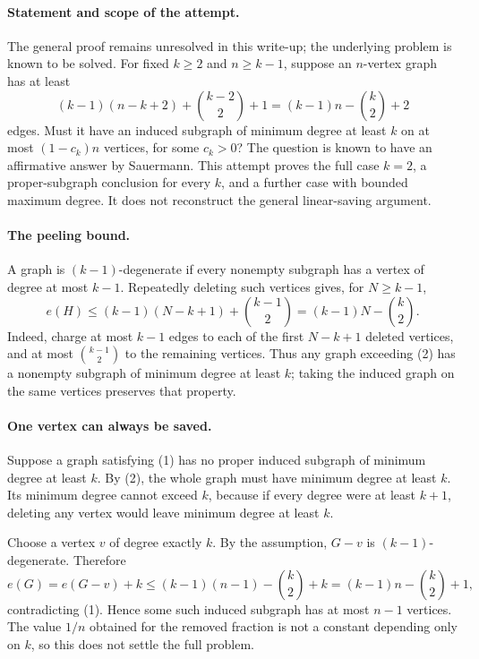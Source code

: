 \paragraph{Statement and scope of the attempt.}
The general proof remains unresolved in this write-up; the underlying problem is known to be solved.
For fixed \(k\geq2\) and \(n\geq k-1\), suppose an \(n\)-vertex graph has at least
\[
 (k-1)(n-k+2)+\binom{k-2}{2}+1
 =(k-1)n-\binom{k}{2}+2
\tag{1}
\]
edges. Must it have an induced subgraph of minimum degree at least \(k\) on at most \((1-c_k)n\) vertices, for some \(c_k>0\)? The question is known to have an affirmative answer by Sauermann. This attempt proves the full case \(k=2\), a proper-subgraph conclusion for every \(k\), and a further case with bounded maximum degree. It does not reconstruct the general linear-saving argument.

\paragraph{The peeling bound.}
A graph is \((k-1)\)-degenerate if every nonempty subgraph has a vertex of degree at most \(k-1\). Repeatedly deleting such vertices gives, for \(N\geq k-1\),
\[
 e(H)\leq(k-1)(N-k+1)+\binom{k-1}{2}
 =(k-1)N-\binom{k}{2}.
\tag{2}
\]
Indeed, charge at most \(k-1\) edges to each of the first \(N-k+1\) deleted vertices, and at most \(\binom{k-1}{2}\) to the remaining vertices. Thus any graph exceeding (2) has a nonempty subgraph of minimum degree at least \(k\); taking the induced graph on the same vertices preserves that property.

\paragraph{One vertex can always be saved.}
Suppose a graph satisfying (1) has no proper induced subgraph of minimum degree at least \(k\). By (2), the whole graph must have minimum degree at least \(k\). Its minimum degree cannot exceed \(k\), because if every degree were at least \(k+1\), deleting any vertex would leave minimum degree at least \(k\).

Choose a vertex \(v\) of degree exactly \(k\). By the assumption, \(G-v\) is \((k-1)\)-degenerate. Therefore
\[
 e(G)=e(G-v)+k
 \leq(k-1)(n-1)-\binom{k}{2}+k
 =(k-1)n-\binom{k}{2}+1,
\]
contradicting (1). Hence some such induced subgraph has at most \(n-1\) vertices. The value \(1/n\) obtained for the removed fraction is not a constant depending only on \(k\), so this does not settle the full problem.

